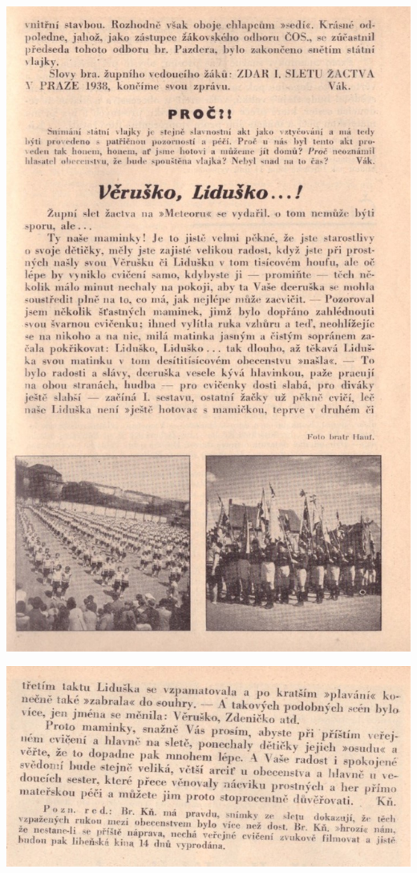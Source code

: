 \documentclass[11pt]{article}
\begin{document}
\includegraphics[width=\imagewidth]{original/1938/Skener_20250318 (6).jpg}

\includegraphics[width=\imagewidth]{original/1938/Skener_20250318 (7).jpg}
\end{document}
